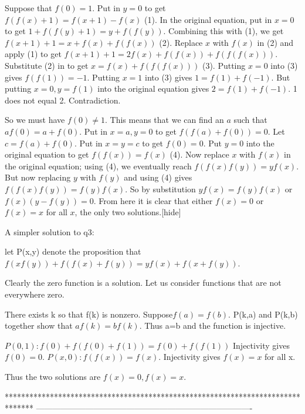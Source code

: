 \begin{solution}Suppose that $f(0) = 1$. Put in $y = 0$ to get $f(f(x)+1) = f(x+1) - f(x)$ (1). In the original equation, put in $x = 0$ to get $1 + f(f(y)+1) = y+f(f(y))$. Combining this with (1), we get $f(x+1) + 1 = x + f(x) + f(f(x))$ (2). Replace $x$ with $f(x)$ in (2) and apply (1) to get $f(x+1) + 1 = 2f(x) + f(f(x)) + f(f(f(x)))$. Substitute (2) in to get $x = f(x) + f(f(f(x)))$ (3). Putting $x = 0$ into (3) gives $f(f(1)) = -1$. Putting $x = 1$ into (3) gives $1 = f(1) + f(-1)$. But putting $x = 0, y = f(1)$ into the original equation gives $2 = f(1) + f(-1)$. 1 does not equal 2. Contradiction.

So we must have $f(0) \neq 1$. This means that we can find an $a$ such that $af(0) = a+f(0)$. Put in $x = a, y = 0$ to get $f(f(a)+f(0)) = 0$. Let $c = f(a) + f(0)$. Put in $x = y = c$ to get $f(0) = 0$. Put $y = 0$ into the original equation to get $f(f(x)) = f(x)$ (4). Now replace $x$ with $f(x)$ in the original equation; using (4), we eventually reach $f(f(x)f(y)) = yf(x)$. But now replacing $y$ with $f(y)$ and using (4) gives $f(f(x)f(y)) = f(y)f(x)$. So by substitution $yf(x) = f(y)f(x)$ or $f(x)(y-f(y)) = 0$. From here it is clear that either $f(x) = 0$ or $f(x) = x$ for all $x$, the only two solutions.[\/hide]
\end{solution}



\begin{solution}
	A simpler solution to q3:

let P(x,y) denote the proposition that
$f(xf(y))+f(f(x)+f(y))=yf(x)+f(x+f(y))$.

Clearly the zero function is a solution. Let us consider functions that are not everywhere zero.

There exists k so that f(k) is nonzero. Suppose$ f(a)=f(b).$
P(k,a) and P(k,b) together show that $af(k)=bf(k)$. Thus a=b and the function is injective.

$P(0,1): f(0)+f(f(0)+f(1))=f(0)+f(f(1))$
Injectivity gives $f(0)=0.$
$P(x,0): f(f(x))=f(x)$.
Injectivity gives $f(x)=x$ for all x.

Thus the two solutions are $f(x)=0, f(x)=x$.
\end{solution}
*******************************************************************************
-------------------------------------------------------------------------------


